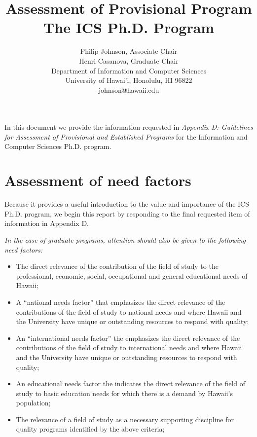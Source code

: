 \documentclass[12pt]{article}
\begin{document}
\title{ Assessment of Provisional Program\\
        {\bf The ICS Ph.D. Program}}


\author{Philip Johnson, Associate Chair \\
        Henri Casanova, Graduate Chair \\
        Department of Information and Computer Sciences \\
        University of Hawai'i,  Honolulu, HI 96822 \\
        johnson@hawaii.edu
}

\maketitle

In this document we provide the information requested in {\em Appendix D:
Guidelines for Assessment of Provisional and Established Programs} for the
Information and Computer Sciences Ph.D. program.

\section{Assessment of need factors}

Because it provides a useful introduction to the value and importance of the ICS
Ph.D. program, we begin this report by responding to the final requested
item of information in Appendix D.

{\em
\medskip \noindent In the case of graduate programs, attention should also be given to the
following need factors:
\begin{itemize}
\item The direct relevance of the contribution of the field of study to the
  professional, economic, social, occupational and general educational
  needs of Hawaii; 
\item A ``national needs factor'' that emphasizes the direct relevance of
  the contributions of the field of study to national needs and where
  Hawaii and the University have unique or outstanding resources to
  respond with quality;
\item An ``international needs factor'' the emphasizes the direct relevance of
  the contributions of the field of study to international needs and where
  Hawaii and the University have unique or outstanding resources to
  respond with quality;
\item An educational needs factor the indicates the direct relevance of the
  field of study to basic education needs for which there is a demand by
  Hawaii's population;
\item The relevance of a field of study as a necessary supporting
  discipline for quality programs identified by the above criteria;
\end{itemize}
}
\end{document}
